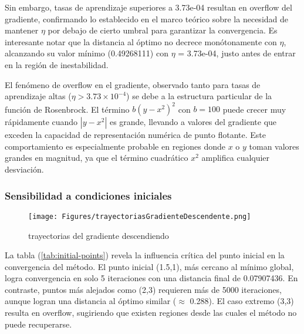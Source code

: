 \documentclass{tp02}
\begin{document}
Sin embargo, tasas de aprendizaje superiores a 3.73e-04 resultan en overflow
del gradiente, confirmando lo establecido en el marco teórico sobre la necesidad
de mantener $\eta$ por debajo de cierto umbral para garantizar la convergencia. Es 
interesante notar que la distancia al óptimo no decrece monótonamente con $\eta$,
alcanzando su valor mínimo (0.49268111) con $\eta$ = 3.73e-04, justo antes de entrar
en la región de inestabilidad.

El fenómeno de overflow en el gradiente, observado tanto para tasas de 
aprendizaje altas ($\eta > 3.73 \times 10^{-4}$) se debe a la estructura particular de la función de Rosenbrock. El término
$b(y - x^2)^2$ con $b = 100$ puede crecer muy rápidamente cuando $|y - x^2|$ es grande,
llevando a valores del gradiente que exceden la capacidad de representación
numérica de punto flotante. Este comportamiento es especialmente probable en
regiones donde $x$ o $y$ toman valores grandes en magnitud, ya que el término
cuadrático $x^2$ amplifica cualquier desviación.

\subsubsection{Sensibilidad a condiciones iniciales}


\begin{figure}[H]
    \centering
    \texttt{[image: Figures/trayectoriasGradienteDescendente.png]}
    \caption{trayectorias del gradiente descendiendo}
    \label{fig:trayectorias del gradiente descendiendo}
    \end{figure}

La tabla (\ref{tab:initial-points}) revela la influencia crítica del punto inicial en la convergencia
del método. El punto inicial (1.5,1), más cercano al mínimo global, logra 
convergencia en solo 5 iteraciones con una distancia final de 0.07907436. En 
contraste, puntos más alejados como (2,3) requieren más de 5000 iteraciones,
aunque logran una distancia al óptimo similar ($\approx$ 0.288). El caso extremo (3,3)
resulta en overflow, sugiriendo que existen regiones desde las cuales el método
no puede recuperarse.
\end{document}
